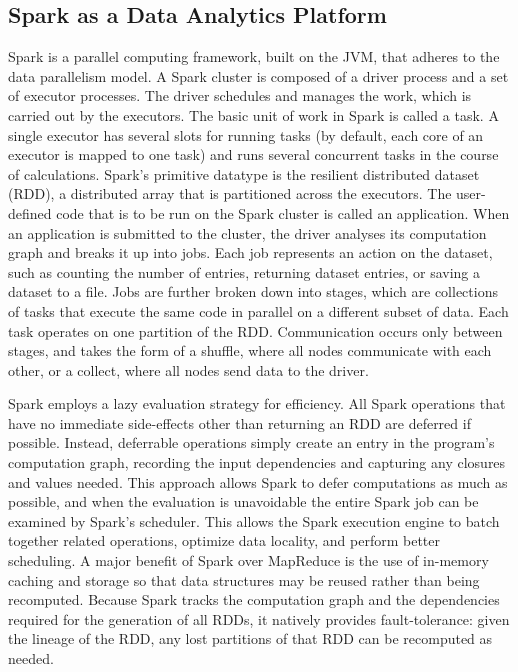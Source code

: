 
\subsection{Spark as a Data Analytics Platform} 

Spark is a parallel computing framework, built on the JVM, that adheres to the data parallelism model. A Spark cluster is composed of a driver process and a set of executor processes. The driver schedules and manages the work, which is carried out by the executors. The basic unit of work in Spark is called a task. A single executor has several slots for running tasks (by default, each core of an executor is mapped to one task) and runs several concurrent tasks in the course of calculations. Spark's primitive datatype is the resilient distributed dataset (RDD), a distributed array that is partitioned across the executors. The user-defined code that is to be run on the Spark cluster is called an application. When an application is submitted to the cluster, the driver analyses its computation graph and breaks it up into jobs.  Each job represents an action on the dataset, such as counting the number of entries, returning dataset entries, or saving a dataset to a file. Jobs are further broken down into stages, which are collections of tasks that execute the same code in parallel on a different subset of data. Each task operates on one partition of the RDD. Communication occurs only between stages, and takes the form of a shuffle, where all nodes communicate with each other, or a collect, where all nodes send data to the driver.

Spark employs a lazy evaluation strategy for efficiency. All Spark operations that have no immediate side-effects other than returning an RDD are deferred if possible. Instead, deferrable operations simply create an entry in the program's computation graph, recording the input dependencies and capturing any closures and values needed. This approach allows Spark to defer computations as much as possible, and when the evaluation is unavoidable the entire Spark job can be examined by Spark's scheduler. This allows the Spark execution engine to batch together related operations, optimize data locality, and perform better scheduling. A major benefit of Spark over MapReduce is the use of in-memory caching and storage so that data structures may be reused rather than being recomputed. Because Spark tracks the computation graph and the dependencies required for the generation of all RDDs, it natively provides fault-tolerance: given the lineage of the RDD, any lost partitions of that RDD can be recomputed as needed.


